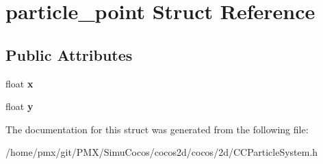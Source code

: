 \hypertarget{structparticle__point}{}\section{particle\+\_\+point Struct Reference}
\label{structparticle__point}
\subsection*{Public Attributes}
\begin{DoxyCompactItemize}
\item 
\mbox{\label{structparticle__point_a42edf70cccd2a19702e688f80ea4f991}} 
float {\bfseries x}
\item 
\mbox{\label{structparticle__point_a56ed9d8fbaec82b51629cbf15c0d6802}} 
float {\bfseries y}
\end{DoxyCompactItemize}


The documentation for this struct was generated from the following file\+:\begin{DoxyCompactItemize}
\item 
/home/pmx/git/\+P\+M\+X/\+Simu\+Cocos/cocos2d/cocos/2d/C\+C\+Particle\+System.\+h\end{DoxyCompactItemize}
